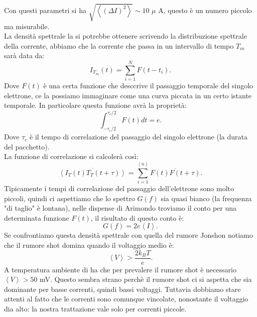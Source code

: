 Con questi parametri si ha $\sqrt{\left<\left( \Delta I \right)^2\right>} \sim 10$ $\mu$ A, questo è un numero piccolo ma misurabile.\\
La densità spettrale la si potrebbe ottenere scrivendo la distribuzione spettrale della corrente, abbiamo che la corrente che passa in un intervallo di tempo $T_m$ sarà data da:
\[
	I_{T_m}( t) =
	\sum_{i=1}^{N} F( t-t_i) 
.\] 
Dove $F(t)$ è una certa funzione che desccrive il passaggio temporale del singolo elettrone, ce la possiamo immaginare come una curva piccata in un certo istante temporale. In particolare questa funzione avrà la proprietà:
\[
	\int_{- \tau_c/2}^{\tau_c/2} F( t) dt = e 
.\] 
Dove $\tau_c$ è il tempo di correlazione del passaggio del singolo elettrone (la durata del pacchetto).\\
La funzione di correlazione si calcolerà così:
\[
	\overline{\left<I_T( t) T_T( t + \tau )  \right>}
	=
	\sum_{i = 1}^{\left<n \right>} \overline{F( t) F( t + \tau ) }
.\] 
Tipicamente i tempi di correlazione del passaggio dell'elettrone sono molto piccoli, quindi ci aspettiamo che lo spettro $G(f)$ sia quasi bianco (la frequenza "di taglio" è lontana), nelle dispense di Arimondo troviamo il conto per una determinata funzione $F(t)$, il risultato di questo conto è:
\[
	G(f) = 2e \left<I\right> 
.\] 
Se confrontiamo questa densità spettrale con quella del rumore Jonshon notiamo che il rumore shot domina quando il voltaggio medio è:
 \[
	\left<V\right> > \frac{2k_BT}{e}
.\] 
A temperatura ambiente di ha che per prevalere il rumore shot è necessario $\left<V \right> > 50$ mV. 
Questo sembra strano perchè il rumore shot ci si aspetta che sia dominante per basse correnti, quindi bassi voltaggi. 
Tuttavia dobbiamo stare attenti al fatto che le correnti sono comunque vincolate, nonostante il voltaggio dia alto: la nostra trattazione vale solo per correnti piccole.

